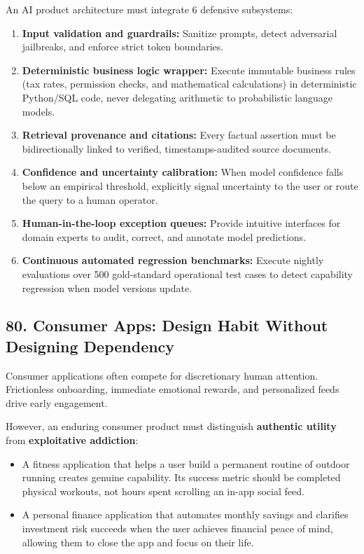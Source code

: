An AI product architecture must integrate 6 defensive subsystems:
\begin{enumerate}
    \item \textbf{Input validation and guardrails:} Sanitize prompts, detect adversarial jailbreaks, and enforce strict token boundaries.
    \item \textbf{Deterministic business logic wrapper:} Execute immutable business rules (tax rates, permission checks, and mathematical calculations) in deterministic Python/SQL code, never delegating arithmetic to probabilistic language models.
    \item \textbf{Retrieval provenance and citations:} Every factual assertion must be bidirectionally linked to verified, timestamps-audited source documents.
    \item \textbf{Confidence and uncertainty calibration:} When model confidence falls below an empirical threshold, explicitly signal uncertainty to the user or route the query to a human operator.
    \item \textbf{Human-in-the-loop exception queues:} Provide intuitive interfaces for domain experts to audit, correct, and annotate model predictions.
    \item \textbf{Continuous automated regression benchmarks:} Execute nightly evaluations over 500 gold-standard operational test cases to detect capability regression when model versions update.
\end{enumerate}

\subsection*{80. Consumer Apps: Design Habit Without Designing Dependency}

Consumer applications often compete for discretionary human attention. Frictionless onboarding, immediate emotional rewards, and personalized feeds drive early engagement.

However, an enduring consumer product must distinguish \textbf{authentic utility} from \textbf{exploitative addiction}:
\begin{itemize}
    \item A fitness application that helps a user build a permanent routine of outdoor running creates genuine capability. Its success metric should be completed physical workouts, not hours spent scrolling an in-app social feed.
    \item A personal finance application that automates monthly savings and clarifies investment risk succeeds when the user achieves financial peace of mind, allowing them to close the app and focus on their life.
\end{itemize}

